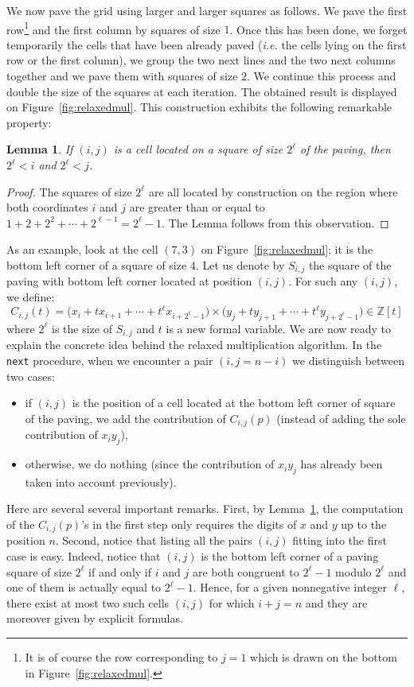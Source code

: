 \documentclass[11pt]{article}
\numberwithin{equation}{section}
\numberwithin{figure}{section}
\newtheorem{lem}[theo]{Lemma}
\theoremstyle{definition}
\newcommand{\Z}{\mathbb Z}
\begin{document}
We now pave the grid using larger and larger squares as follows. We pave 
the first row\footnote{It is of course the row corresponding to $j=1$ 
which is drawn on the bottom in Figure~\ref{fig:relaxedmul}.} and the 
first column by squares of size $1$. Once this has been done, we forget
temporarily the cells that have been already paved (\emph{i.e.} the 
cells lying on the first row or the first column), we 
group the two next lines and the two next columns together and we pave 
them with squares of size $2$. We continue this process and double the
size of the squares at each iteration. The obtained result is displayed
on Figure~\ref{fig:relaxedmul}.
This construction exhibits the following remarkable property:

\begin{lem}
\label{lem:paving}
If $(i,j)$ is a cell located on a square of size $2^\ell$ of the paving, 
then $2^\ell < i$ and $2^\ell < j$.
\end{lem}

\begin{proof}
The squares of size $2^\ell$ are all located by construction on the 
region where both coordinates $i$ and $j$ are greater than or equal to 
$1 + 2 + 2^2 + \cdots + 2^{\ell-1} = 2^\ell - 1$. The Lemma follows from 
this observation.
\end{proof}

\noindent
As an example, look at the cell $(7,3)$ on Figure~\ref{fig:relaxedmul}; 
it is the bottom left corner of a square of size $4$.
Let us denote by
$S_{i,j}$ the square of the paving with bottom left corner located at
position $(i,j)$. For such any $(i,j)$, we define:
$$C_{i,j}(t) = \big(x_i + t x_{i+1} + \cdots + t^\ell x_{i+2^\ell-1}\big)
\times \big(y_j + t y_{j+1} + \cdots + t^\ell y_{j+2^\ell-1}\big) \in
\Z[t]$$
where $2^\ell$ is the size of $S_{i,j}$ and $t$ is a new formal
variable.
We are now ready to explain the concrete idea behind the relaxed 
multiplication algorithm. In the \texttt{next} procedure, when we 
encounter a pair $(i,j=n{-}i)$ we distinguish between two cases:
\begin{itemize}
\renewcommand{\itemsep}{0pt}
\item if $(i,j)$ is the position of a cell located at the bottom left
corner of square of the paving, we add the contribution of $C_{i,j}(p)$
(instead of adding the sole contribution of $x_i y_j$),
\item otherwise, we do nothing (since the contribution of $x_i y_j$ 
has already been taken into account previously).
\end{itemize}
Here are several several important remarks. First, by 
Lemma~\ref{lem:paving}, the computation of the $C_{i,j}(p)$'s in the 
first step only requires the digits of $x$ and $y$ up to the position 
$n$. Second, notice that listing all the pairs $(i,j)$ fitting into 
the first case is easy. Indeed, notice that $(i,j)$ is the bottom left 
corner of a paving square of size $2^\ell$ if and only if $i$ and $j$ 
are both congruent to $2^\ell - 1$ modulo $2^\ell$ and one of them is 
actually equal to $2^\ell - 1$. Hence, for a given nonnegative integer 
$\ell$, there exist at most two such cells $(i,j)$ for which $i+j = n$ 
and they are moreover given by explicit formulas.
\end{document}
